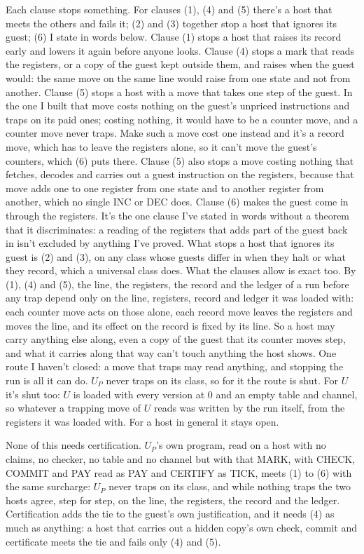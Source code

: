 \documentclass[11pt,twoside]{article}
\theoremstyle{thielethm}
\theoremstyle{thieledef}
\theoremstyle{thieledef}
\theoremstyle{thieledef}
\theoremstyle{thielethm}
\theoremstyle{thieleobs}
\theoremstyle{thielethm}
\begin{document}
Each clause stops something. For clauses (1), (4) and (5) there's a host that meets the others
and fails it; (2) and (3) together stop a host that ignores its guest; (6) I state in words below. Clause (1) stops a host that raises its record early and lowers it again
before anyone looks. Clause (4) stops a mark that reads the registers, or a copy of the guest kept
outside them, and raises when the guest would: the same move on the same line would raise from one
state and not from another. Clause (5) stops a host with a move that takes one step of the guest.
In the one I built that move costs nothing on the guest's unpriced instructions and traps on its
paid ones; costing nothing, it would have to be a counter move, and a counter move never traps. Make
such a move cost one instead and it's a record move, which has to leave the registers alone, so it
can't move the guest's counters, which (6) puts there. Clause (5) also stops a move costing nothing that
fetches, decodes and carries out a guest instruction on the registers, because that move adds one
to one register from one state and to another register from another, which no single INC or DEC
does. Clause (6) makes the guest come in through the registers. It's the one clause I've stated in
words without a theorem that it discriminates: a reading of the registers that adds part of the
guest back in isn't excluded by anything I've proved. What stops a host that ignores its guest is
(2) and (3), on any class whose guests differ in when they halt or what they record, which a
universal class does. What the clauses allow is exact too. By (1), (4) and (5), the line, the registers, the
record and the ledger of a run before any trap depend only on the line, registers, record and ledger it was loaded with: each counter move acts on those alone, each record move leaves the registers and
moves the line, and its effect on the record is fixed by its line. So a host may carry anything else
along, even a copy of the guest that its counter moves step, and what it carries along that way can't touch
anything the host shows. One route I haven't closed: a move that traps may read anything, and
stopping the run is all it can do. $U_P$ never traps on its class, so for it the route is shut. For $U$ it's shut too: $U$ is loaded with every version at 0 and an empty table and channel, so whatever a trapping move of $U$ reads was written by the run itself, from the registers it was loaded with. For a host in general it stays open.

None of this needs certification. $U_P$'s own program, read on a host with no claims, no checker, no table and no channel but with that MARK, with CHECK, COMMIT and PAY read as PAY and CERTIFY as TICK, meets (1) to
(6) with the same surcharge: $U_P$ never traps on its class, and while nothing traps the two hosts
agree, step for step, on the line, the registers, the record and the ledger. Certification adds the
tie to the guest's own justification, and it needs (4) as much as anything: a host that carries out
a hidden copy's own check, commit and certificate meets the tie and fails only (4) and (5).
\end{document}
